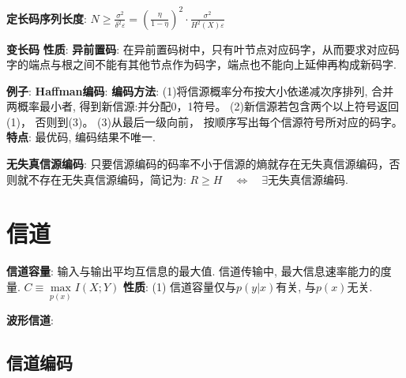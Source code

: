 \documentclass{article}
\begin{document}
                \textbf{定长码序列长度}: $N \geqslant \frac{\sigma^{2}}{\delta^{2} \varepsilon}=\left(\frac{\eta}{1-\eta}\right)^{2} \cdot \frac{\sigma^{2}}{H^{2}(X) \varepsilon}$

        \textbf{变长码}  
            \textbf{性质}:
                \textbf{异前置码}: 在异前置码树中，只有叶节点对应码字，从而要求对应码字的端点与根之间不能有其他节点作为码字，端点也不能向上延伸再构成新码字.
                
            \textbf{例子}:
                \textbf{Haffman编码}:
                    \textbf{编码方法}:
                        (1)将信源概率分布按大小依递减次序排列, 合并两概率最小者, 得到新信源:并分配0，1符号。
                        (2)新信源若包含两个以上符号返回(1)， 否则到(3)。
                        (3)从最后一级向前， 按顺序写出每个信源符号所对应的码字。
                    \textbf{特点}:
                        最优码, 编码结果不唯一.
                    
        \textbf{无失真信源编码}: 只要信源编码的码率不小于信源的熵就存在无失真信源编码，否则就不存在无失真信源编码，简记为: $ R \ge H \quad \Leftrightarrow  \quad \exists \text{无失真信源编码}$.
        

\section{信道}
    \textbf{信道容量}: 输入与输出平均互信息的最大值. 信道传输中, 最大信息速率能力的度量. $C \equiv \max\limits_{p(x)} I(X ; Y)$
        \textbf{性质}:
            (1) 信道容量仅与$p(y|x)$有关, 与$p(x)$无关.

    \textbf{波形信道}: 

    \subsection{信道编码}
        
\end{document}
